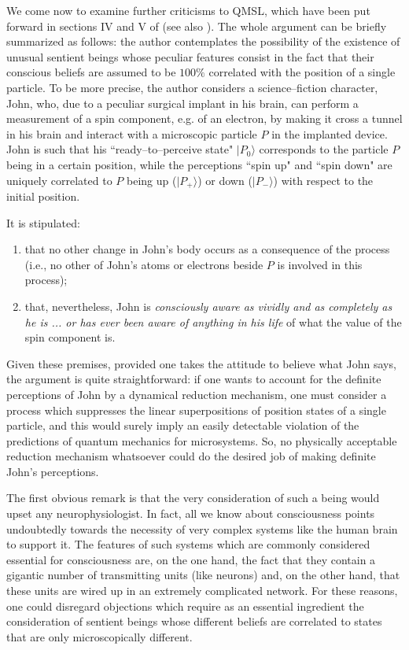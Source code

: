 \documentclass[12pt]{article}
\begin{document}
We come now to examine further criticisms to QMSL, which have been
put forward in sections IV and V of \cite{ap} (see also
\cite{al5}). The whole argument can be briefly summarized as
follows: the author contemplates the possibility of the existence
of unusual sentient beings whose peculiar features consist in the
fact that their conscious beliefs are assumed to be $100\%$
correlated with the position of a single particle. To be more
precise, the author considers a science--fiction character, John,
who, due to a peculiar surgical implant in his brain, can perform
a measurement of a spin component, e.g. of an electron, by making
it cross a tunnel in his brain and interact with a microscopic
particle $P$ in the implanted device. John is such that his
``ready--to--perceive state" $|P_{0}\rangle$ corresponds to the
particle $P$ being in a certain position, while the perceptions
``spin up" and ``spin down" are uniquely correlated to $P$ being
up ($|P_{+}\rangle$) or down ($|P_{-}\rangle$) with respect to the
initial position.

It is stipulated:
\begin{enumerate}
\item that no other change in John's body occurs as a consequence
of the process (i.e., no other of John's atoms or electrons beside
$P$ is involved in this process);
\item that, nevertheless, John is {\it consciously aware as vividly
and as completely as he is ... or has ever been aware of anything
in his life} of what the value of the spin component is.
\end{enumerate}

Given these premises, provided one takes the attitude to believe
what John says, the argument is quite straightforward: if one
wants to account for the definite perceptions of John by a
dynamical reduction mechanism, one must consider a process which
suppresses the linear superpositions of position states of a
single particle, and this would surely imply an easily detectable
violation of the predictions of quantum mechanics for
microsystems. So, no physically acceptable reduction mechanism
whatsoever could do the desired job of making definite John's
perceptions.

The first obvious remark is that the very consideration of such a
being would upset any neurophysiologist. In fact, all we know
about consciousness points undoubtedly towards the necessity of
very complex systems like the human brain to support it. The
features of such systems which are commonly considered essential
for consciousness are, on the one hand, the fact that they contain
a gigantic number of transmitting units (like neurons) and, on the
other hand, that these units are wired up in an extremely
complicated network. For these reasons, one could disregard
objections which require as an essential ingredient the
consideration of sentient beings whose different beliefs are
correlated to states that are only microscopically different.
\end{document}
